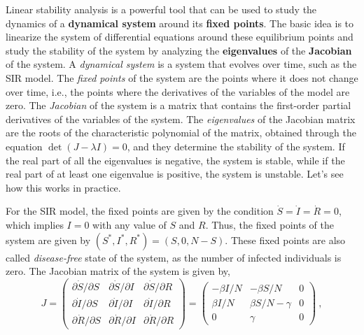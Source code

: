 Linear stability analysis is a powerful tool that can be used to study the
dynamics of a \textbf{dynamical system} around its \textbf{fixed points}. The
basic idea is to linearize the system of differential equations around these
equilibrium points and study the stability of the system by analyzing the
\textbf{eigenvalues} of the \textbf{Jacobian} of the system. A
\textit{dynamical system} is a system that evolves over time,
such as the SIR model. The \textit{fixed points} of the system are the points
where it does not change over time, i.e., the points where the derivatives of
the variables of the model are zero. The \textit{Jacobian} of the system is a
matrix that contains the first-order partial derivatives of the variables of
the system. The \textit{eigenvalues} of the Jacobian matrix are the roots of
the characteristic polynomial of the matrix, obtained through the equation
$\det(J-\lambda I)=0 $, and they determine the stability of the system. If the
real part of all the eigenvalues is negative, the system is stable, while if
the real part of at least one eigenvalue is positive, the system is unstable.
Let's see how this works in practice.

For the SIR model, the fixed points are given by the condition
$\dot{S}=\dot{I}=\dot{R}=0$, which implies $I=0$ with any value of $S$ and $R$.
Thus, the fixed points of the system are given by $(S^*,I^*,R^*)=(S,0,N-S)$.
These fixed points are also called \textit{disease-free} state of the system,
as the number of infected individuals is zero. The Jacobian matrix of the
system is given by,
\begin{equation}
  J=\begin{pmatrix}
    \partial\dot{S}/\partial S & \partial\dot{S}/\partial I &
    \partial\dot{S}/\partial R                                \\
    \partial\dot{I}/\partial S & \partial\dot{I}/\partial I &
    \partial\dot{I}/\partial R                                \\
    \partial\dot{R}/\partial S & \partial\dot{R}/\partial I &
    \partial\dot{R}/\partial R
  \end{pmatrix}=\begin{pmatrix}
    -\beta I/N & -\beta S/N       & 0 \\
    \beta I/N  & \beta S/N-\gamma & 0 \\
    0          & \gamma           & 0
  \end{pmatrix} \ ,
\end{equation}

